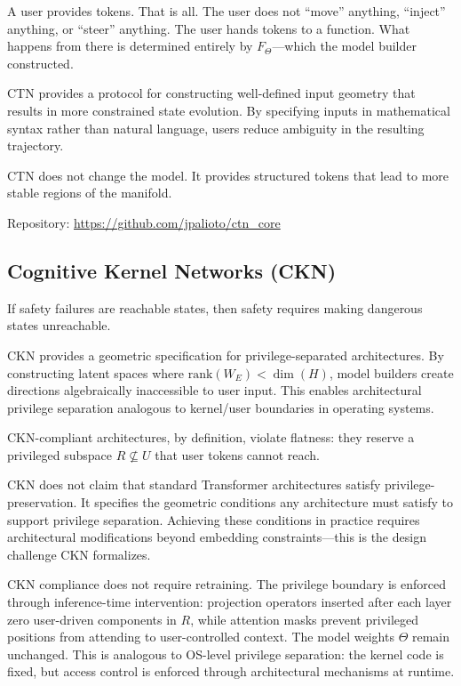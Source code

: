 \documentclass[11pt,a4paper]{article}
\begin{document}
A user provides tokens. That is all. The user does not ``move'' anything, ``inject'' anything, or ``steer'' anything. The user hands tokens to a function. What happens from there is determined entirely by $F_\Theta$---which the model builder constructed.

CTN provides a protocol for constructing well-defined input geometry that results in more constrained state evolution. By specifying inputs in mathematical syntax rather than natural language, users reduce ambiguity in the resulting trajectory.

CTN does not change the model. It provides structured tokens that lead to more stable regions of the manifold.

Repository: \url{https://github.com/jpalioto/ctn_core}

\subsection{Cognitive Kernel Networks (CKN)}

If safety failures are reachable states, then safety requires making dangerous states unreachable.

CKN provides a geometric specification for privilege-separated architectures. By constructing latent spaces where $\text{rank}(W_E) < \dim(H)$, model builders create directions algebraically inaccessible to user input. This enables architectural privilege separation analogous to kernel/user boundaries in operating systems.

CKN-compliant architectures, by definition, violate flatness: they reserve a privileged subspace $R \not\subseteq U$ that user tokens cannot reach.

CKN does not claim that standard Transformer architectures satisfy privilege-preservation. It specifies the geometric conditions any architecture must satisfy to support privilege separation. Achieving these conditions in practice requires architectural modifications beyond embedding constraints---this is the design challenge CKN formalizes.

CKN compliance does not require retraining. The privilege boundary is enforced through inference-time intervention: projection operators inserted after each layer zero user-driven components in $R$, while attention masks prevent privileged positions from attending to user-controlled context. The model weights $\Theta$ remain unchanged. This is analogous to OS-level privilege separation: the kernel code is fixed, but access control is enforced through architectural mechanisms at runtime.
\end{document}
